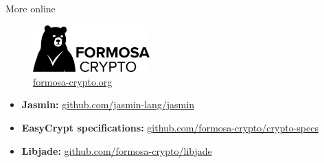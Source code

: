 \begin{frame}{More online}
  \begin{center}
    \begin{figure}[t]
      \centering
      \includegraphics[width=0.4\textwidth]{formosa}
      \caption*{\Large \url{formosa-crypto.org}}
    \end{figure}
  \end{center}
  \vspace*{.5cm}
  \begin{itemize}
  \item[] \textbf{Jasmin:} \url{github.com/jasmin-lang/jasmin}
  \item[] \textbf{EasyCrypt specifications:}
    \url{github.com/formosa-crypto/crypto-specs}
  \item[] \textbf{Libjade:} \url{github.com/formosa-crypto/libjade}
  \end{itemize}
\end{frame}

